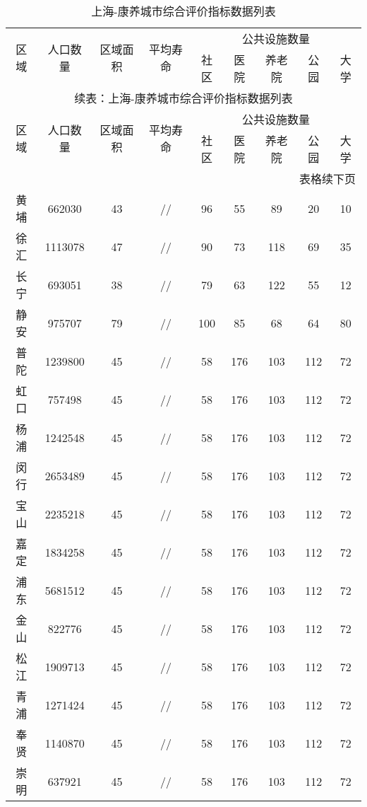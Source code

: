 \documentclass[12pt,a4paper]{article}
\begin{document}
\begin{longtable}{c|c|cc|ccccc}
\caption{上海-康养城市综合评价指标数据列表} \\
\toprule[2pt]
\multirow{2}{*}{区域} & \multirow{2}{*}{人口数量} & \multirow{2}{*}{区域面积}& \multirow{2}{*}{平均寿命}& \multicolumn{5}{c}{公共设施数量} \\
\cline{5-9}
& & & & 社区 & 医院 & 养老院 & 公园 & 大学 \\
\midrule[1pt]
\endfirsthead

\multicolumn{9}{c}{续表：上海-康养城市综合评价指标数据列表} \\
\toprule[2pt]
\multirow{2}{*}{区域} & \multirow{2}{*}{人口数量} & \multirow{2}{*}{区域面积}& \multirow{2}{*}{平均寿命}& \multicolumn{5}{c}{公共设施数量} \\
\cline{5-9}
& & & & 社区 & 医院 & 养老院 & 公园 & 大学 \\
\midrule[1pt]
\endhead

\hline
\multicolumn{9}{r}{表格续下页} \\
\endfoot

\hline
\endlastfoot

黄埔 & 662030 & 43 & // & 96 & 55 & 89 & 20 & 10 \\
徐汇 & 1113078 & 47 & // & 90 & 73 & 118 & 69 & 35 \\
长宁 & 693051 & 38 & // & 79 & 63 & 122 & 55 & 12 \\
静安 & 975707 & 79 & // & 100 & 85 & 68 & 64 & 80 \\
普陀 & 1239800 & 45 & // & 58 & 176 & 103 & 112 & 72 \\
虹口 & 757498 & 45 & // & 58 & 176 & 103 & 112 & 72 \\
杨浦 & 1242548 & 45 & // & 58 & 176 & 103 & 112 & 72 \\
闵行 & 2653489 & 45 & // & 58 & 176 & 103 & 112 & 72 \\
宝山 & 2235218 & 45 & // & 58 & 176 & 103 & 112 & 72 \\
嘉定 & 1834258 & 45 & // & 58 & 176 & 103 & 112 & 72 \\
浦东 & 5681512 & 45 & // & 58 & 176 & 103 & 112 & 72 \\
金山 & 822776 & 45 & // & 58 & 176 & 103 & 112 & 72 \\
松江 & 1909713 & 45 & // & 58 & 176 & 103 & 112 & 72 \\
青浦 & 1271424 & 45 & // & 58 & 176 & 103 & 112 & 72 \\
奉贤 & 1140870 & 45 & // & 58 & 176 & 103 & 112 & 72 \\
崇明 & 637921 & 45 & // & 58 & 176 & 103 & 112 & 72 \\

\bottomrule[2pt]

\end{longtable}
\end{document}
